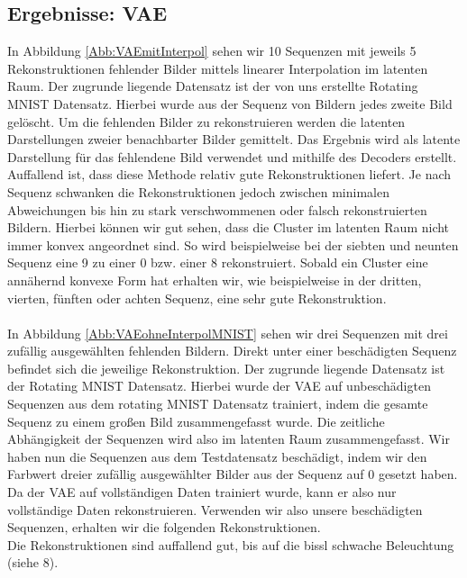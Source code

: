 \documentclass[12pt]{article}
\begin{document}
	\subsection[VAE]{Ergebnisse: VAE}
	In Abbildung \ref{Abb:VAEmitInterpol} sehen wir 10 Sequenzen mit jeweils 5 Rekonstruktionen 
	fehlender Bilder mittels linearer Interpolation im latenten Raum. Der zugrunde liegende Datensatz ist der von uns erstellte Rotating MNIST Datensatz. Hierbei 
	wurde aus der Sequenz von Bildern jedes zweite Bild gelöscht. Um die fehlenden Bilder zu rekonstruieren werden die latenten Darstellungen zweier benachbarter 
	Bilder gemittelt. Das Ergebnis wird als latente Darstellung für das fehlendene Bild verwendet und mithilfe des Decoders erstellt. \\
	Auffallend ist, dass diese Methode relativ gute Rekonstruktionen liefert. 
	Je nach Sequenz schwanken die Rekonstruktionen jedoch zwischen minimalen Abweichungen bis hin zu stark verschwommenen oder falsch rekonstruierten Bildern. Hierbei können wir gut sehen, dass die Cluster im latenten Raum 
	nicht immer konvex angeordnet sind. So wird beispielweise bei der siebten und 
	neunten Sequenz eine 9 zu einer 0 bzw. einer 8 rekonstruiert. Sobald ein Cluster eine annähernd konvexe Form hat erhalten wir, wie beispielweise in der 
	dritten, vierten, fünften oder achten Sequenz, eine sehr gute Rekonstruktion.\\
	\\
	In Abbildung \ref{Abb:VAEohneInterpolMNIST} sehen wir drei Sequenzen mit 
	drei zufällig ausgewählten fehlenden Bildern. Direkt unter einer 
	beschädigten Sequenz befindet sich die jeweilige Rekonstruktion. 
	Der zugrunde liegende Datensatz ist der Rotating MNIST Datensatz. Hierbei 
	wurde der VAE auf unbeschädigten Sequenzen aus dem rotating MNIST Datensatz 
	trainiert, indem die gesamte Sequenz zu einem großen Bild zusammengefasst wurde. Die zeitliche Abhängigkeit der Sequenzen wird also im latenten Raum 
	zusammengefasst. Wir haben nun die Sequenzen aus dem Testdatensatz beschädigt, indem wir den Farbwert dreier zufällig ausgewählter Bilder aus der Sequenz 
	auf 0 gesetzt haben. Da der VAE auf vollständigen Daten trainiert wurde, 
	kann er also nur vollständige Daten rekonstruieren. Verwenden wir also unsere 
	beschädigten Sequenzen, erhalten wir die folgenden Rekonstruktionen.\\
	Die Rekonstruktionen sind auffallend gut, bis auf die bissl schwache Beleuchtung (siehe 8).
\end{document}
